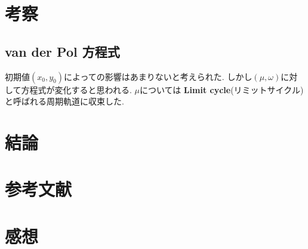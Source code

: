 \documentclass[12pt,a4paper]{jsarticle}
\begin{document}
\section{考察}
\subsection{van der Pol 方程式}
初期値$(x_0, y_0)$によっての影響はあまりないと考えられた. しかし$(\mu, \omega)$に対して方程式が変化すると思われる. $\mu$については
\textbf{Limit cycle}(リミットサイクル)と呼ばれる周期軌道に収束した.


\section{結論}
\section{参考文献}
\section{感想}
\end{document}
